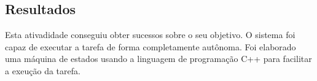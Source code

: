 
\subsection{Resultados}

Esta ativadidade conseguiu obter sucessos sobre o seu objetivo. O sistema foi capaz de executar a tarefa de forma completamente autônoma. Foi elaborado uma máquina de estados usando a linguagem de programação C++ para facilitar a exeução da tarefa.